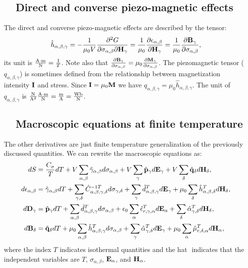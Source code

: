 \documentclass[12pt,a4paper,twoside]{report}
\begin{document}
\subsection{\ \ Direct and converse piezo-magnetic effects}
The direct and converse piezo-magnetic effects are described by the 
tensor:
\begin{equation}
\hat h_{\alpha,\beta,\gamma}=-{1\over \mu_0 V} {\partial^2 G \over
\partial \sigma_{\alpha,\beta} \partial {\bf H}_\gamma}= {1\over \mu_0}
{\partial \epsilon_{\alpha,\beta} \over \partial {\bf H}_\gamma}= 
{1 \over \mu_0}{\partial {\bf B}_\gamma \over \partial \sigma_{\alpha,\beta}},
\end{equation}
its unit is ${{\rm A}\cdot {\rm m} \over {\rm N}} = {1\over T}$. Note also that 
${\partial {\bf B}_\gamma \over \partial \sigma_{\alpha,\beta}}
=\mu_0 {\partial {\bf M}_\gamma \over \partial \sigma_{\alpha,\beta}}$.
The piezomagnetic tensor 
($q_{\alpha,\beta,\gamma}$) is sometimes defined
from the relationship between magnetization intensity ${\bf I}$
and stress. Since ${\bf I}=\mu_0 {\bf M}$ we have
$q_{\alpha,\beta,\gamma}=\mu_0 \hat h_{\alpha,\beta,\gamma}$. The
unit of $q_{\alpha,\beta,\gamma}$ is ${{\rm N}\over {\rm A}^2}{{\rm A} \cdot {\rm m}\over {\rm N}}
={{\rm m}\over {\rm A}}={{\rm Wb}\over {\rm N}}$. 


\subsection{\ \ Macroscopic equations at finite temperature}
The other derivatives are just finite temperature generalization of the
previously discussed quantities. We can rewrite the macroscopic equations as:
\begin{align}
dS&= {C_\sigma\over T} dT+ V \sum_{\alpha,\beta} \hat \gamma_{\alpha,\beta} 
d\sigma_{\alpha,\beta}
+ V \sum_\gamma \hat {\bf p}_\gamma d{\bf E}_{\gamma} + 
V \sum_\delta \hat {\bf q}_\delta d{\bf H}_{\delta}, \\
d\epsilon_{\alpha,\beta}&= \hat \gamma_{\alpha,\beta} dT + 
\sum_{\gamma,\delta} \hat C^{-1 T}_{\alpha,\beta,\gamma,\delta} 
d \sigma_{\gamma,\delta} + \sum_\gamma \hat d^T_{\alpha,\beta,\gamma} 
d{\bf E}_{\gamma} +\mu_0 
\sum_\delta \hat h^T_{\alpha,\beta,\delta} d{\bf H}_{\delta}, \\
d{\bf D}_\gamma&=
\hat {\bf p}_\gamma dT + \sum_{\alpha,\beta} \hat 
d^T_{\alpha,\beta,\gamma} d\sigma_{\alpha,\beta}
+\epsilon_0 \sum_\alpha \hat \epsilon^T_{r,\gamma,\alpha} d{\bf E}_{\alpha} + 
\sum_\delta \hat \alpha^T_{\gamma,\delta} d{\bf H}_{\delta}, \\
d{\bf B}_\delta&=
\hat {\bf q}_\delta dT+ \mu_0 \sum_{\alpha,\beta}
\hat h^T_{\alpha,\beta,\gamma}
d\sigma_{\alpha,\beta}
+\sum_\gamma \hat \alpha^T_{\gamma,\delta}
d{\bf E}_{\gamma}+ \mu_0
\sum_\alpha \hat \mu^T_{r,\delta,\alpha}
d{\bf H}_{\alpha}, 
\end{align}
where the index $T$ indicates isothermal quantities and the hat $\hat{}$
indicates that the independent variables are $T$, $\sigma_{\alpha,\beta}$, 
${\bf E}_\alpha$, and ${\bf H}_\alpha$. 
\end{document}
